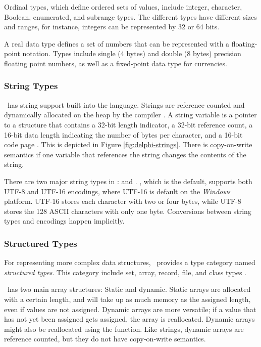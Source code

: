 Ordinal types, which define ordered sets of values, include integer, character, Boolean, enumerated, and subrange types. The different types have different sizes and ranges, for instance, integers can be represented by 32 or 64 bits.

A real data type defines a set of numbers that can be represented with a floating-point notation. Types include single (4 bytes) and double (8 bytes) precision floating point numbers, as well as a fixed-point data type for currencies.

\subsubsection{String Types}
\label{ssub:String Types}
\delphi~has string support built into the language. Strings are reference counted and dynamically allocated on the heap by the compiler \cite{Wikipedia_contributors2016-jk}. A string variable is a pointer to a structure that contains a 32-bit length indicator, a 32-bit reference count, a 16-bit data length indicating the number of bytes per character, and a 16-bit code page \cite{noauthor_undated-cp}. This is depicted in Figure \ref{fig:delphi-strings}. There is copy-on-write semantics if one variable that references the string changes the contents of the string.

There are two major string types in \delphi:  and . , which is the default, supports both UTF-8 and UTF-16 encodings, where UTF-16 is default on the \textit{Windows} platform. UTF-16 stores each character with two or four bytes, while UTF-8 stores the 128 ASCII characters with only one byte. Conversions between string types and encodings happen implicitly.

\subsubsection{Structured Types}
\label{ssub:Structured Types}
For representing more complex data structures, \delphi~provides a type category named \textit{structured types}. This category include set, array, record, file, and class types \cite{noauthor_undated-vu}.

\delphi~has two main array structures: Static and dynamic. Static arrays are allocated with a certain length, and will take up as much memory as the assigned length, even if values are not assigned. Dynamic arrays are more versatile; if a value that has not yet been assigned gets assigned, the array is reallocated. Dynamic arrays might also be reallocated using the  function. Like strings, dynamic arrays are reference counted, but they do not have copy-on-write semantics.

